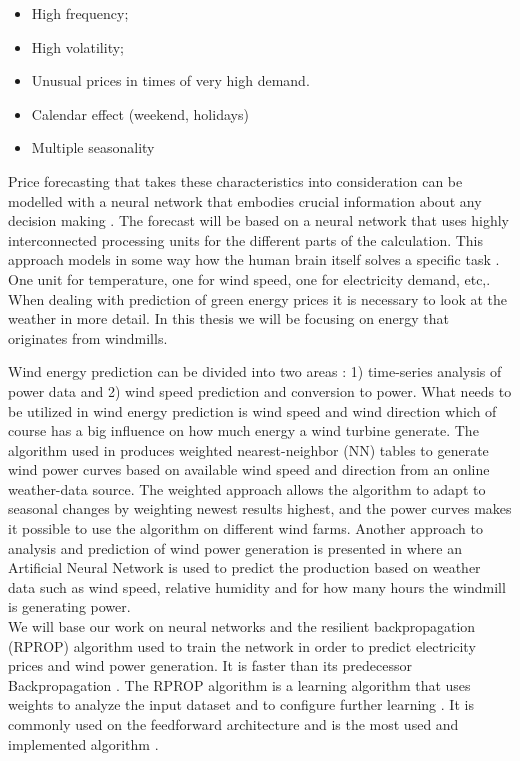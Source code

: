 \documentclass[twoside,11pt,openright]{report}
\begin{document}
\begin{itemize}
\item High frequency;
\item High volatility;
\item Unusual prices in times of very high demand.
\item Calendar effect (weekend, holidays)
\item Multiple seasonality
\end{itemize}
Price forecasting that takes these characteristics into consideration can be modelled with a neural network that embodies crucial information about any decision making \cite{1}. The forecast will be based on a neural network that uses highly interconnected processing units for the different parts of the calculation. This approach models in some way how the human brain itself solves a specific task \cite{1}\cite{2}. One unit for temperature, one for wind speed, one for electricity demand, etc,.\cite{3} 
\\[0.5cm] 
When dealing with prediction of green energy prices it is necessary to look at the weather in more detail. In this thesis we will be focusing on energy that originates from windmills. 

Wind energy prediction can be divided into two areas \cite{5}: 1) time-series analysis of power data and 2) wind speed prediction and conversion to power. What needs to be utilized in wind energy prediction is wind speed and wind direction which of course has a big influence on how much energy a wind turbine generate. The algorithm used in \cite{5} produces weighted nearest-neighbor (NN) tables to generate wind power curves based on available wind speed and direction from an online weather-data source. The weighted approach allows the algorithm to adapt to seasonal changes by weighting newest results highest, and the power curves makes it possible to use the algorithm on different wind farms. Another approach to analysis and prediction of wind power generation is presented in \cite{WindPowerGenerationUsingANN} where an Artificial Neural Network is used to predict the production based on weather data such as wind speed, relative humidity and for how many hours the windmill is generating power. 
\\[0.5cm]
We will base our work on neural networks and the resilient backpropagation (RPROP) algorithm used to train the network in order to predict electricity prices and wind power generation. It is faster than its predecessor Backpropagation \cite{8,15}.  The RPROP algorithm is a learning algorithm that uses weights to analyze the input dataset and to configure further learning \cite{17}. It is commonly used on the feedforward architecture and is the most used and implemented algorithm \cite{14,17}.
\end{document}
